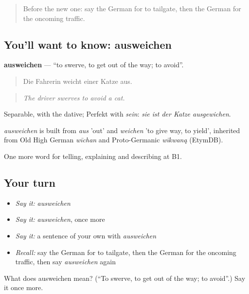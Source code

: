 \label{lesson:GE-C408-ausweichen}



\begin{quote}
Before the new one: say the German for to tailgate, then the German for the oncoming traffic.
\end{quote}

\subsection*{You'll want to know: ausweichen}
\textbf{ausweichen} — \textquotedblleft{}to swerve, to get out of the way; to avoid\textquotedblright{}.

\begin{quote}
Die Fahrerin weicht einer Katze aus.
\end{quote}

\begin{quote}
\emph{The driver swerves to avoid a cat.}
\end{quote}

Separable, with the dative; Perfekt with \emph{sein}: \emph{sie ist der Katze ausgewichen}.

\begin{cousinweb}
\emph{ausweichen} is built from \emph{aus} 'out' and \emph{weichen} 'to give way, to yield', inherited from Old High German \emph{wīchan} and Proto-Germanic \emph{wīkwaną} (EtymDB).
\end{cousinweb}

\begin{grammarlens}[title={What you've built}]
One more word for telling, explaining and describing at B1.
\end{grammarlens}

\subsection*{Your turn}
\begin{itemize}
\raggedright
  \item \emph{Say it:} \emph{ausweichen}
  \item \emph{Say it:} \emph{ausweichen}, once more
  \item \emph{Say it:} a sentence of your own with \emph{ausweichen}
  \item \emph{Recall:} say the German for to tailgate, then the German for the oncoming traffic, then say \emph{ausweichen} again
\end{itemize}

\begin{tcolorbox}[breakable,colback=teal!4,colframe=teal!35!black,title={Before you move on}]
What does ausweichen mean? (\textquotedblleft{}To swerve, to get out of the way; to avoid\textquotedblright{}.) Say it once more.
\end{tcolorbox}

